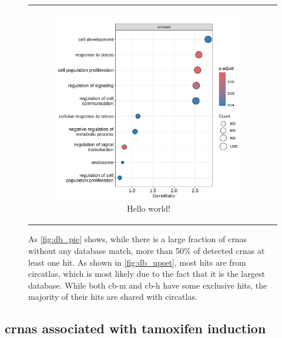\begin{figure}[H]
\begin{tabular}{cc}
\begin{subfigure}{0.5\textwidth}
            \includegraphics[width=\linewidth]{chapters/4_results_and_discussion/figures/dea/deseq2/esr1/dot.png}
            \caption{Hello world!
            }
            \label{fig:esr1_go_terms}
        \end{subfigure} &

    \end{tabular}
    \caption{As \cref{fig:db_pie} shows, while there is a large fraction of
        \glspl{crna} without any
        database match, more than 50\% of detected \glspl{crna} at least one
        hit.
        As shown in \cref{fig:db_upset}, most hits are from \gls{circatlas}, which is
        most likely due to the fact that it is the largest database.
        While both \gls{cb-m} and \gls{cb-h} have some exclusive hits, the majority of
        their hits are shared with \gls{circatlas}.
    }
    \label{fig:dea_esr1}
\end{figure}

\subsection{\Glspl{crna} associated with tamoxifen induction}

